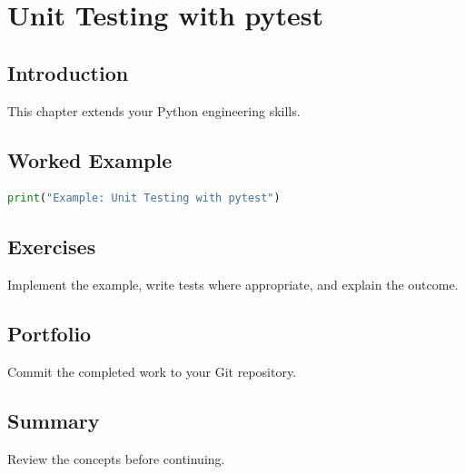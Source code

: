 \chapter{Unit Testing with pytest}
\label{chap:vol3-22}



\section{Introduction}
This chapter extends your Python engineering skills.

\section{Worked Example}
\begin{lstlisting}[language=Python]
print("Example: Unit Testing with pytest")
\end{lstlisting}

\section{Exercises}
\begin{exercise}
Implement the example, write tests where appropriate, and explain the outcome.
\end{exercise}

\section{Portfolio}
Commit the completed work to your Git repository.

\section{Summary}
Review the concepts before continuing.
